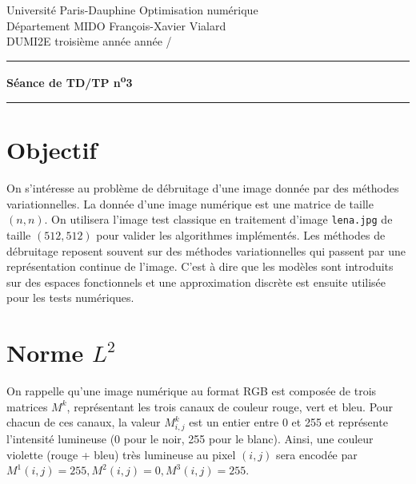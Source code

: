 \documentclass[10pt,a4paper,fleqn]{report}
\makeatletter
\def\cleardoublepage{\clearpage\if@twoside\ifodd\c@page\else\hbox{}\thispagestyle{empty}\newpage\fi\fi}
\makeatother
\begin{document}
\cleardoublepage

\noindent
Universit\'e Paris-Dauphine     \hfill      Optimisation num\'erique\\
D\'epartement MIDO              \hfill      François-Xavier Vialard\\
DUMI2E troisi\`eme ann\'ee      \hfill      ann\'ee /

\medskip

\hrule

\medskip

\begin{center}

\textbf{\huge S\'{e}ance de TD/TP n\textsuperscript{o}3}

\smallskip

\rule{10cm}{0.4pt}

\end{center}


\section*{Objectif}
On s'int\'eresse au probl\`eme de d\'ebruitage d'une image donn\'ee
par des m\'ethodes variationnelles. La donn\'ee d'une image
num\'erique est une matrice de taille $(n,n)$. On utilisera l'image
test classique en traitement d'image \texttt{lena.jpg} de taille
$(512,512)$ pour valider les algorithmes impl\'ement\'es. Les
m\'ethodes de d\'ebruitage reposent souvent sur des m\'ethodes
variationnelles qui passent par une repr\'esentation continue de
l'image. C'est \`a dire que les mod\`eles sont introduits sur des
espaces fonctionnels et une approximation discr\`ete est ensuite
utilis\'ee pour les tests num\'eriques.


\section{Norme $L^{2}$}

On rappelle qu'une image numérique au format RGB est composée de trois
matrices $M^{k}$, représentant les trois canaux de couleur rouge, vert
et bleu. Pour chacun de ces canaux, la valeur $M^{k}_{i,j}$ est un
entier entre 0 et 255 et représente l'intensité lumineuse (0 pour le
noir, 255 pour le blanc). Ainsi, une couleur violette (rouge + bleu)
très lumineuse au pixel $(i,j)$ sera encodée par $M^{1}(i,j) = 255,
M^{2}(i,j) = 0, M^{3}(i,j) = 255$.
\end{document}

